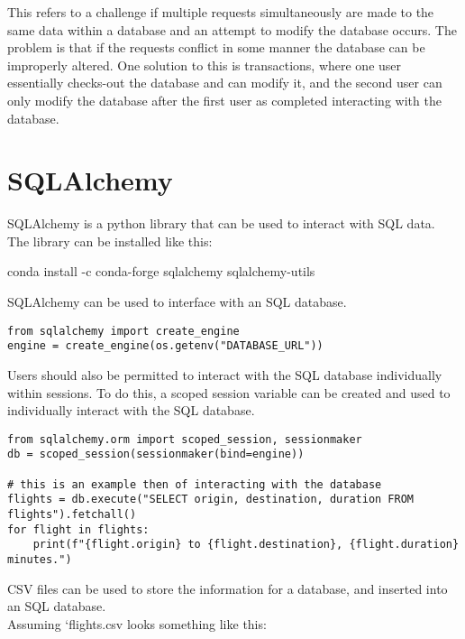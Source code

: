 \documentclass[]{book}
\newenvironment{Shaded}{\begin{snugshade}}{\end{snugshade}}
\newcommand{\ExtensionTok}[1]{#1}
\newcommand{\NormalTok}[1]{#1}
\begin{document}
This refers to a challenge if multiple requests simultaneously are made
to the same data within a database and an attempt to modify the database
occurs. The problem is that if the requests conflict in some manner the
database can be improperly altered. One solution to this is
transactions, where one user essentially checks-out the database and can
modify it, and the second user can only modify the database after the
first user as completed interacting with the database.

\section{SQLAlchemy}\label{sqlalchemy}

SQLAlchemy is a python library that can be used to interact with SQL
data.\\
The library can be installed like this:

\begin{Shaded}
\begin{Highlighting}[]
\ExtensionTok{conda}\NormalTok{ install -c conda-forge sqlalchemy sqlalchemy-utils}
\end{Highlighting}
\end{Shaded}

SQLAlchemy can be used to interface with an SQL database.

\begin{verbatim}
from sqlalchemy import create_engine
engine = create_engine(os.getenv("DATABASE_URL"))
\end{verbatim}

Users should also be permitted to interact with the SQL database
individually within sessions. To do this, a scoped session variable can
be created and used to individually interact with the SQL database.

\begin{verbatim}
from sqlalchemy.orm import scoped_session, sessionmaker
db = scoped_session(sessionmaker(bind=engine))

# this is an example then of interacting with the database
flights = db.execute("SELECT origin, destination, duration FROM flights").fetchall()
for flight in flights:
    print(f"{flight.origin} to {flight.destination}, {flight.duration} minutes.")
\end{verbatim}

CSV files can be used to store the information for a database, and
inserted into an SQL database.\\
Assuming `flights.csv looks something like this:
\end{document}
